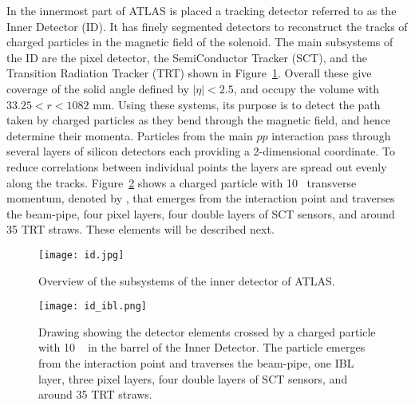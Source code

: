 In the innermost part of ATLAS is placed a tracking detector referred to as the Inner Detector (ID). 
It has finely segmented detectors to reconstruct the tracks of charged particles in the magnetic field of the solenoid.
The main subsystems of the ID are the pixel detector, the SemiConductor Tracker (SCT), and the Transition Radiation Tracker (TRT)
shown in Figure~\ref{fig:exp.atlas.id.all}.
Overall these give coverage of the solid angle defined
by $|\eta| < 2.5$, and occupy the volume with $33.25 < r < 1082$ mm. Using these systems,
its purpose is to detect the path taken by charged particles as they bend through the
magnetic field, and hence determine their momenta.
Particles from the main $pp$ interaction pass through several layers of silicon detectors each providing a 2-dimensional coordinate. 
To reduce correlations between individual points the layers are spread out evenly along the tracks.
Figure~\ref{fig:exp.atlas.id.rad} shows a charged particle with 10 \GeV~transverse momentum, denoted by \pt, that
emerges from the interaction point and traverses the beam-pipe, four pixel layers, 
four double layers of SCT sensors, and around 35 TRT straws.
These elements will be described next.

\begin{figure}[htb!]
\centering
\texttt{[image: id.jpg]}
\caption{Overview of the subsystems of the inner detector of ATLAS.}
\label{fig:exp.atlas.id.all}
\end{figure}

\begin{figure}[htb!]
\centering
\texttt{[image: id\_ibl.png]}
\caption{Drawing showing the detector elements crossed by a charged particle with 10 \GeV~\pt
in the barrel of the Inner Detector. The particle emerges from the interaction point and traverses the beam-pipe, 
one IBL layer, three pixel layers, four double layers of SCT sensors, and around 35 TRT straws.}
\label{fig:exp.atlas.id.rad}
\end{figure}

